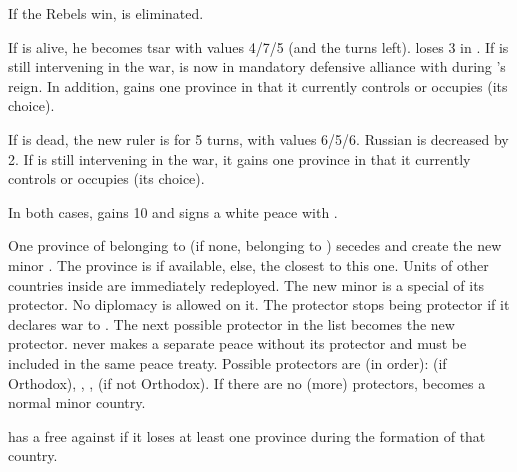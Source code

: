 \aparag If the Rebels win,  is eliminated.

\bparag If \leaderDmitry is alive, he becomes tsar \monarqueDimitri with
values 4/7/5 (and the turns left). \RUS loses 3 in \STAB.  If \POL is still
intervening in the war, \RUS is now in mandatory defensive alliance with \POL
during \monarqueDimitri's reign. In addition, \POL gains one province in \RUS
that it currently controls or occupies (its choice).

\bparag If \leaderDmitry is dead, the new ruler is \monarqueRomanov for 5
turns, with values 6/5/6. Russian \STAB is decreased by 2.  If \POL is still
intervening in the war, it gains one province in \RUS that it currently
controls or occupies (its choice).

\bparag In both cases, \POL gains 10 \PV and signs a white peace with \RUS.







\phevnt
\aparag One province of \paysukraine belonging to \POL (if none, belonging to
\HAB) secedes and create the new minor \paysukraine. The province is
\provincePoltava if available, else, the closest to this one. Units of other
countries inside are immediately redeployed.
\aparag The new minor is a special \VASSAL of its protector. No diplomacy is
allowed on it.
\bparag The protector stops being protector if it declares war to
\paysukraine. The next possible protector in the list becomes the new
protector.
\aparag \paysukraine never makes a separate peace without its protector and
must be included in the same peace treaty.
\aparag Possible protectors are (in order): \POL (if Orthodox), \RUS, \TUR,
\POL (if not Orthodox). If there are no (more) protectors, \paysukraine
becomes a normal minor country.

\phdipl
\aparag \POL has a free \CB against \paysukraine if it loses at least one
province during the formation of that country.

